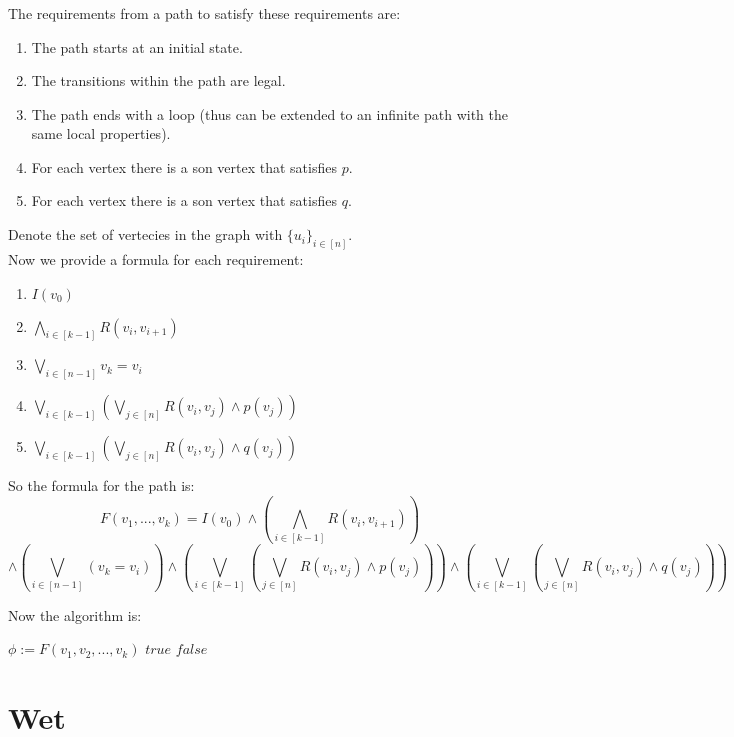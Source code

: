\documentclass{article}
\begin{document}
\section{}
The requirements from a path to satisfy these requirements are:
\begin{enumerate}
    \item The path starts at an initial state.
    \item The transitions within the path are legal.
    \item The path ends with a loop (thus can be extended to an infinite path with the same local properties).
    \item For each vertex there is a son vertex that satisfies $p$.
    \item For each vertex there is a son vertex that satisfies $q$.
\end{enumerate}
Denote the set of vertecies in the graph with $\{u_i\}_{i\in[n]}$.\\
Now we provide a formula for each requirement:
\begin{enumerate}
    \item $I(v_0)$
    \item $\bigwedge_{i\in[k-1]}R(v_i,v_{i+1})$
    \item $\bigvee_{i\in[n-1]}v_k=v_i$
    \item $\bigvee_{i\in[k-1]}(\bigvee_{j\in[n]}R(v_i,v_j)\wedge p(v_j))$
    \item $\bigvee_{i\in[k-1]}(\bigvee_{j\in[n]}R(v_i,v_j)\wedge q(v_j))$
\end{enumerate}

So the formula for the path is:
\[
    F(v_1,...,v_k)=
    I(v_0)
    \wedge\left(\bigwedge_{i\in[k-1]}R(v_i,v_{i+1})\right)
\]\[
    \wedge\left(\bigvee_{i\in[n-1]}(v_k=v_i)\right)
    \wedge\left(\bigvee_{i\in[k-1]}(\bigvee_{j\in[n]}R(v_i,v_j)\wedge p(v_j))\right)
    \wedge\left(\bigvee_{i\in[k-1]}(\bigvee_{j\in[n]}R(v_i,v_j)\wedge q(v_j))\right)
\]
\newpage

Now the algorithm is:
\begin{algorithmic}
        \State $\phi:=F(v_1,v_2,...,v_k)$
            \State \Return $true$
        \EndIf
    \EndFor
    \State \Return $false$
\end{algorithmic}

\part{Wet}
\setcounter{section}{0}
\end{document}
